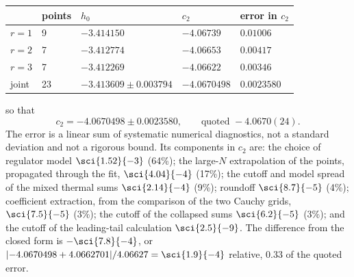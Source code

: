 \begin{center}\small
\begin{tabular}{@{}lllll@{}}
\toprule
& points & $h_0$ & $c_2$ & error in $c_2$\\
\midrule
$r=1$ & 9 & $-3.414150$ & $-4.06739$ & $0.01006$\\
$r=2$ & 7 & $-3.412774$ & $-4.06653$ & $0.00417$\\
$r=3$ & 7 & $-3.412269$ & $-4.06622$ & $0.00346$\\
joint & 23 & $-3.413609\pm0.003794$ & $-4.0670498$ & $0.0023580$\\
\bottomrule
\end{tabular}
\end{center}
so that
\begin{equation}
 c_2=-4.0670498\pm0.0023580,\qquad\text{quoted }-4.0670(24).
\end{equation}
The error is a linear sum of systematic numerical diagnostics, not a standard deviation and not a rigorous bound.
Its components in $c_2$ are: the choice of regulator model $\sci{1.52}{-3}$ (64\%); the large-$N$ extrapolation of the
points, propagated through the fit, $\sci{4.04}{-4}$ (17\%); the cutoff and model spread of the mixed thermal sums
$\sci{2.14}{-4}$ (9\%); roundoff $\sci{8.7}{-5}$ (4\%); coefficient extraction, from the comparison of the two Cauchy
grids, $\sci{7.5}{-5}$ (3\%); the cutoff of the collapsed sums $\sci{6.2}{-5}$ (3\%); and the cutoff of the
leading-tail calculation $\sci{2.5}{-9}$. The difference from the closed form is $-\sci{7.8}{-4}$, or
$|{-4.0670498}+4.0662701|/4.06627=\sci{1.9}{-4}$ relative, 0.33 of the quoted error.

